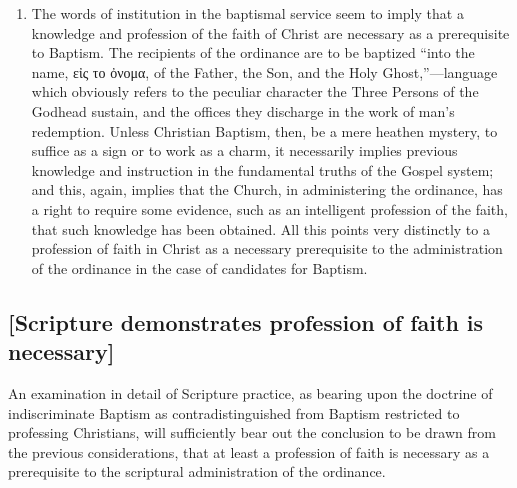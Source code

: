 \documentclass[
]{book}
\begin{document}
\begin{enumerate}
\item
  The words of institution in the baptismal service seem to imply that a knowledge and profession of the faith of Christ are necessary as a prerequisite to Baptism. The recipients of the ordinance are to be baptized ``into the name, \foreignlanguage{greek}{εἰς το ὀνομα}, of the Father, the Son, and the Holy Ghost,''---language which obviously refers to the peculiar character the Three Persons of the Godhead sustain, and the offices they discharge in the work of man's redemption. Unless Christian Baptism, then, be a mere heathen mystery, to suffice as a sign or to work as a charm, it necessarily implies previous knowledge and instruction in the fundamental truths of the Gospel system; and this, again, implies that the Church, in administering the ordinance, has a right to require some evidence, such as an intelligent profession of the faith, that such knowledge has been obtained. All this points very distinctly to a profession of faith in Christ as a necessary prerequisite to the administration of the ordinance in the case of candidates for Baptism.
\end{enumerate}

\hypertarget{scripture-demonstrates-profession-of-faith-is-necessary}{%
\subsection{{[}Scripture demonstrates profession of faith is necessary{]}}\label{scripture-demonstrates-profession-of-faith-is-necessary}}

An examination in detail of Scripture practice, as bearing upon the doctrine of indiscriminate Baptism as contradistinguished from Baptism restricted to professing Christians, will sufficiently bear out the conclusion to be drawn from the previous considerations, that at least a profession of faith is necessary as a prerequisite to the scriptural administration of the ordinance.
\end{document}

